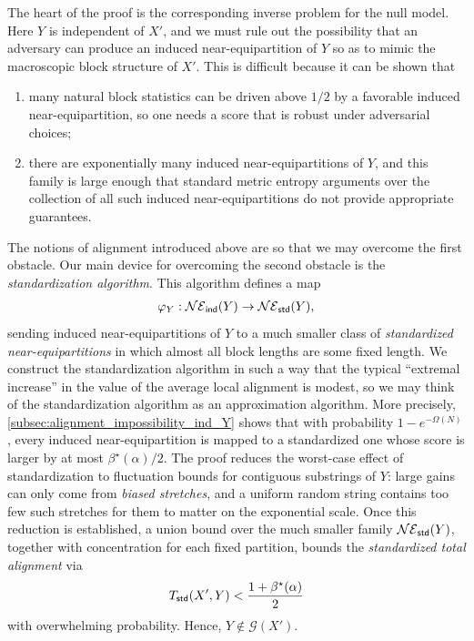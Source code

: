 \documentclass[11pt]{amsart}
\numberwithin{equation}{section}
\numberwithin{equation}{section}
\newcommand{\1}{\mathbbm{1}}
\newcommand{\ind}{\textup{\textsf{ind}}}
\newcommand{\std}{\textup{\textsf{std}}}
\theoremstyle{definition}
\begin{document}
The heart of the proof is the corresponding inverse problem for the null model. Here $Y$ is independent of $X'$, and we must rule out the possibility that an adversary can produce an induced near-equipartition of $Y$ so as to mimic the macroscopic block structure of $X'$. This is difficult because it can be shown that
\begin{enumerate}
    \item many natural block statistics can be driven above $1/2$ by a favorable induced near-equipartition, so one needs a score that is robust under adversarial choices;

    \item there are exponentially many induced near-equipartitions of $Y$, and this family is large enough that standard metric entropy arguments over the collection of all such induced near-equipartitions do not provide appropriate guarantees.
\end{enumerate}
The notions of alignment introduced above are so that we may overcome the first obstacle. Our main device for overcoming the second obstacle is the \emph{standardization algorithm}. This algorithm defines a map
\begin{align*}
    \varphi_Y : \mathcal{NE}_\ind(Y) \to \mathcal{NE}_\std(Y),
\end{align*}
sending induced near-equipartitions of $Y$ to a much smaller class of \textit{standardized near-equipartitions} in which almost all block lengths are some fixed length. We construct the standardization algorithm in such a way that the typical ``extremal increase'' in the value of the average local alignment is modest, so we may think of the standardization algorithm as an approximation algorithm. More precisely, \cref{subsec:alignment_impossibility_ind_Y} shows that with probability $1 - e^{-\Omega(N)}$, every induced near-equipartition is mapped to a standardized one whose score is larger by at most $\beta^\star(\alpha)/2$. The proof reduces the worst-case effect of standardization to fluctuation bounds for contiguous substrings of $Y$: large gains can only come from \textit{biased stretches}, and a uniform random string contains too few such stretches for them to matter on the exponential scale. Once this reduction is established, a union bound over the much smaller family $\mathcal{NE}_\std(Y)$, together with concentration for each fixed partition, bounds the \textit{standardized total alignment} via
\begin{align*}
    T_\std(X',Y) < \frac{1+\beta^\star(\alpha)}{2}
\end{align*}
with overwhelming probability. Hence, $Y \notin \mathcal G(X')$.
\end{document}
